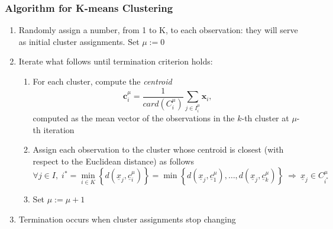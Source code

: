 \documentclass[a4paper]{article}
\begin{document}
	\subsubsection{Algorithm for K-means Clustering}
	\begin{enumerate}
		\item Randomly assign a number, from 1 to K, to each observation: they will
		serve as initial cluster assignments. Set $\mu:=0$
		\item Iterate what follows until termination criterion holds:
		\begin{enumerate}
			\item For each cluster, compute the \textsl{centroid}
			$$
			\boldsymbol{c}_{i}^{\mu}=\frac{1}{card(C_{i}^{\mu})}\underset{j\in I_{i}^{\mu}}{\sum}\boldsymbol{x}_{i},
			$$
			computed as the mean vector of the observations in the $k$-th cluster
			at $\mu$-th iteration
			\item Assign each observation to the cluster whose centroid is closest (with
			respect to the Euclidean distance) as follows
			$$
			\forall j\in I,\;i^{*}=\underset{i\in K}{\min}\left\{ d(\underline{x}_{j},\underline{c}_{i}^{\mu})\right\} =\min\left\{ d(\underline{x}_{j},\underline{c}_{1}^{\mu}),\ldots,d(\underline{x}_{j},\underline{c}_{k}^{\mu})\right\} \:\Longrightarrow\:\underline{x}_{j}\in C_{i^{*}}^{\mu}
			$$
			\item Set $\mu:=\mu+1$
		\end{enumerate}
		\item Termination occurs when cluster assignments stop changing
	\end{enumerate}
\end{document}
